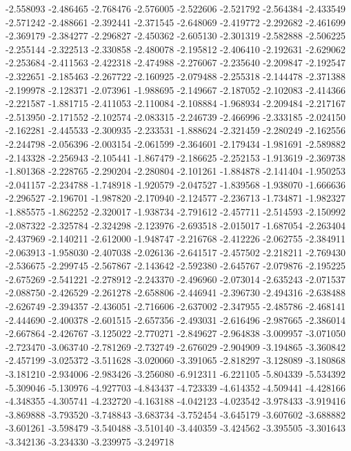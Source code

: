 -2.558093
-2.486465
-2.768476
-2.576005
-2.522606
-2.521792
-2.564384
-2.433549
-2.571242
-2.488661
-2.392441
-2.371545
-2.648069
-2.419772
-2.292682
-2.461699
-2.369179
-2.384277
-2.296827
-2.450362
-2.605130
-2.301319
-2.582888
-2.506225
-2.255144
-2.322513
-2.330858
-2.480078
-2.195812
-2.406410
-2.192631
-2.629062
-2.253684
-2.411563
-2.422318
-2.474988
-2.276067
-2.235640
-2.209847
-2.192547
-2.322651
-2.185463
-2.267722
-2.160925
-2.079488
-2.255318
-2.144478
-2.371388
-2.199978
-2.128371
-2.073961
-1.988695
-2.149667
-2.187052
-2.102083
-2.414366
-2.221587
-1.881715
-2.411053
-2.110084
-2.108884
-1.968934
-2.209484
-2.217167
-2.513950
-2.171552
-2.102574
-2.083315
-2.246739
-2.466996
-2.333185
-2.024150
-2.162281
-2.445533
-2.300935
-2.233531
-1.888624
-2.321459
-2.280249
-2.162556
-2.244798
-2.056396
-2.003154
-2.061599
-2.364601
-2.179434
-1.981691
-2.589882
-2.143328
-2.256943
-2.105441
-1.867479
-2.186625
-2.252153
-1.913619
-2.369738
-1.801368
-2.228765
-2.290204
-2.280804
-2.101261
-1.884878
-2.141404
-1.950253
-2.041157
-2.234788
-1.748918
-1.920579
-2.047527
-1.839568
-1.938070
-1.666636
-2.296527
-2.196701
-1.987820
-2.170940
-2.124577
-2.236713
-1.734871
-1.982327
-1.885575
-1.862252
-2.320017
-1.938734
-2.791612
-2.457711
-2.514593
-2.150992
-2.087322
-2.325784
-2.324298
-2.123976
-2.693518
-2.015017
-1.687054
-2.263404
-2.437969
-2.140211
-2.612000
-1.948747
-2.216768
-2.412226
-2.062755
-2.384911
-2.063913
-1.958030
-2.407038
-2.026136
-2.641517
-2.457502
-2.218211
-2.769430
-2.536675
-2.299745
-2.567867
-2.143642
-2.592380
-2.645767
-2.079876
-2.195225
-2.675269
-2.541221
-2.278912
-2.243370
-2.496960
-2.073014
-2.635243
-2.071537
-2.088750
-2.426529
-2.261278
-2.658806
-2.446941
-2.396730
-2.494316
-2.638488
-2.626749
-2.394357
-2.436051
-2.716606
-2.637002
-2.347955
-2.485786
-2.468141
-2.444690
-2.400378
-2.601515
-2.657356
-2.493031
-2.616496
-2.987665
-2.386014
-2.667864
-2.426767
-3.125022
-2.770271
-2.849627
-2.964838
-3.009957
-3.071050
-2.723470
-3.063740
-2.781269
-2.732749
-2.676029
-2.904909
-3.194865
-3.360842
-2.457199
-3.025372
-3.511628
-3.020060
-3.391065
-2.818297
-3.128089
-3.180868
-3.181210
-2.934006
-2.983426
-3.256080
-6.912311
-6.221105
-5.804339
-5.534392
-5.309046
-5.130976
-4.927703
-4.843437
-4.723339
-4.614352
-4.509441
-4.428166
-4.348355
-4.305741
-4.232720
-4.163188
-4.042123
-4.023542
-3.978433
-3.919416
-3.869888
-3.793520
-3.748843
-3.683734
-3.752454
-3.645179
-3.607602
-3.688882
-3.601261
-3.598479
-3.540488
-3.510140
-3.440359
-3.424562
-3.395505
-3.301643
-3.342136
-3.234330
-3.239975
-3.249718
